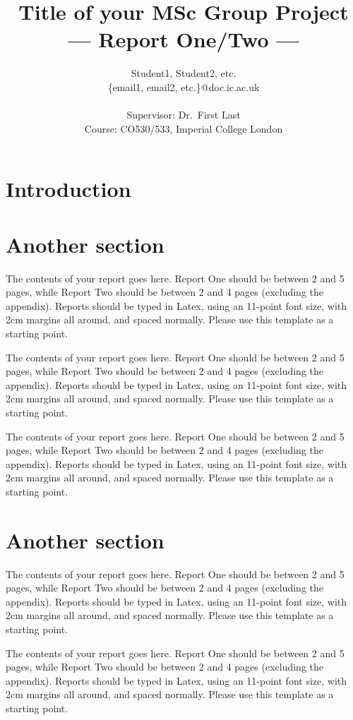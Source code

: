 \documentclass[a4paper,11pt]{article}
\title{Title of your MSc Group Project\\\Large{--- Report One/Two ---}}
\author{Student1, Student2, etc.\\
       \{email1, email2, etc.\}@doc.ic.ac.uk\\ \\
       \small{Supervisor: Dr.\ First Last}\\
       \small{Course: CO530/533, Imperial College London}
}
\begin{document}
\maketitle

\section{Introduction}




\section{Another section}

The contents of your report goes here.  Report One should be between 2
and 5 pages, while Report Two should be between 2 and 4 pages
(excluding the appendix).  Reports should be typed in Latex, using an
11-point font size, with 2cm margins all around, and spaced normally.
Please use this template as a starting point.

The contents of your report goes here.  Report One should be between 2
and 5 pages, while Report Two should be between 2 and 4 pages
(excluding the appendix).  Reports should be typed in Latex, using an
11-point font size, with 2cm margins all around, and spaced normally.
Please use this template as a starting point.

The contents of your report goes here.  Report One should be between 2
and 5 pages, while Report Two should be between 2 and 4 pages
(excluding the appendix).  Reports should be typed in Latex, using an
11-point font size, with 2cm margins all around, and spaced normally.
Please use this template as a starting point.


\section{Another section}

The contents of your report goes here.  Report One should be between 2
and 5 pages, while Report Two should be between 2 and 4 pages
(excluding the appendix).  Reports should be typed in Latex, using an
11-point font size, with 2cm margins all around, and spaced normally.
Please use this template as a starting point.

The contents of your report goes here.  Report One should be between 2
and 5 pages, while Report Two should be between 2 and 4 pages
(excluding the appendix).  Reports should be typed in Latex, using an
11-point font size, with 2cm margins all around, and spaced normally.
Please use this template as a starting point.
\end{document}
